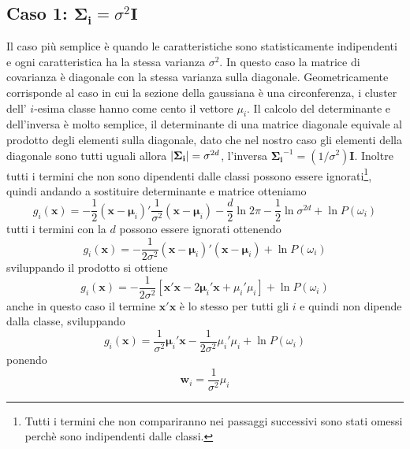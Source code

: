 \subsection{Caso 1: $\mathbf{\Sigma_i} = \sigma^2\mathbf{I}$}
Il caso più semplice è quando le caratteristiche sono statisticamente indipendenti e ogni caratteristica ha la stessa varianza $\sigma^2$. In questo caso la matrice di covarianza è diagonale con la stessa varianza sulla diagonale. Geometricamente corrisponde al caso in cui la sezione della gaussiana è una circonferenza, i cluster dell' $i$-esima classe hanno come cento il vettore $\mu_i$. Il calcolo del determinante e dell'inversa è molto semplice, il determinante di una matrice diagonale equivale al prodotto degli elementi sulla diagonale, dato che nel nostro caso gli elementi della diagonale sono tutti uguali allora $\lvert\mathbf{\Sigma_i}\rvert = \sigma^{2d}$, l'inversa $\mathbf{\Sigma_i}^{-1} = (1/\sigma^2)\mathbf{I}$. Inoltre tutti i termini che non sono dipendenti dalle classi possono essere ignorati\footnote{Tutti i termini che non compariranno nei passaggi successivi sono stati omessi perchè sono indipendenti dalle classi.}, quindi andando a sostituire determinante e matrice otteniamo
\begin{equation}
g_i(\mathbf{x}) = -\frac{1}{2}(\mathbf{x} - \mathbf{\mu}_i)' \frac{1}{\sigma^2} (\mathbf{x} - \mathbf{\mu}_i) - \frac{d}{2} \ln 2\pi - \frac{1}{2} \ln \sigma^{2d} + \ln P(\omega_i)
\end{equation}
tutti i termini con la $d$ possono essere ignorati ottenendo 
\begin{equation}
g_i(\mathbf{x}) = -\frac{1}{2\sigma^2} (\mathbf{x} - \mathbf{\mu}_i)' (\mathbf{x} - \mathbf{\mu}_i) + \ln P(\omega_i)
\end{equation}
sviluppando il prodotto  si ottiene
\begin{equation}
g_i(\mathbf{x}) = -\frac{1}{2\sigma^2} \left [ \mathbf{x'x}  - 2\mathbf{\mu}_i' \mathbf{x} + \mu_i' \mu_i\right ] + \ln P(\omega_i)
\end{equation}
anche in questo caso il termine $\mathbf{x'x}$ è lo stesso per tutti gli $i$ e quindi non dipende dalla classe, sviluppando
\begin{equation}
g_i(\mathbf{x}) = \frac{1}{\sigma^2} \mathbf{\mu}_i' \mathbf{x} - \frac{1}{2\sigma^2}\mu_i' \mu_i + \ln P(\omega_i)
\end{equation}
ponendo 
\begin{equation}\label{w}
\mathbf{w}_i = \frac{1}{\sigma^2}\mu_i
\end{equation}
